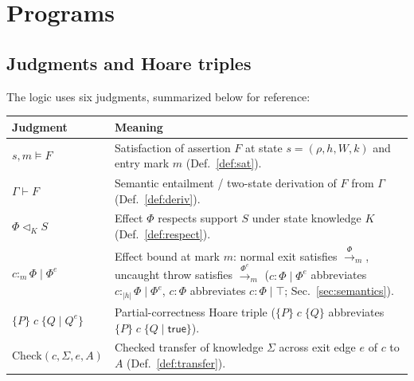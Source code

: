\documentclass[10pt,a4paper]{article}
\theoremstyle{definition}
\theoremstyle{remark}
\newcommand{\kw}[1]{\mathsf{#1}}
\newcommand{\len}[1]{|#1|}
\newcommand{\tr}[1]{\xrightarrow{#1}}
\newcommand{\resp}{\mathrel{\triangleleft}}
\newcommand{\hoare}[3]{\{#1\}\;#2\;\{#3\}}
\newcommand{\hoarex}[4]{\{#1\}\;#2\;\{#3\mid #4\}}
\begin{document}
\section{Programs}\label{sec:programs}

\subsection{Judgments and Hoare triples}

The logic uses six judgments, summarized below for reference:

\begin{center}\small
\begin{tabularx}{\textwidth}{@{}lX@{}}
\toprule
Judgment & Meaning\\
\midrule
$s,m\models F$ & Satisfaction of assertion $F$ at state $s=(\rho,h,W,k)$ and entry mark $m$ (Def.~\ref{def:sat}).\\
$\Gamma\vdash F$ & Semantic entailment / two-state derivation of $F$ from $\Gamma$ (Def.~\ref{def:deriv}).\\
$\Phi\resp_K S$ & Effect $\Phi$ respects support $S$ under state knowledge $K$ (Def.~\ref{def:respect}).\\
$c:_{m}\Phi\mid\Phi^{e}$ & Effect bound at mark $m$: normal exit satisfies $\tr{\Phi}_m$, uncaught throw satisfies $\tr{\Phi^{e}}_m$ ($c:\Phi\mid\Phi^{e}$ abbreviates $c:_{\len h}\Phi\mid\Phi^{e}$, $c:\Phi$ abbreviates $c:\Phi\mid\top$; Sec.~\ref{sec:semantics}).\\
$\hoarex{P}{c}{Q}{Q^{e}}$ & Partial-correctness Hoare triple ($\hoare{P}{c}{Q}$ abbreviates $\hoarex{P}{c}{Q}{\kw{true}}$).\\
$\mathrm{Check}(c,\Sigma,e,A)$ & Checked transfer of knowledge $\Sigma$ across exit edge $e$ of $c$ to $A$ (Def.~\ref{def:transfer}).\\
\bottomrule
\end{tabularx}
\end{center}
\end{document}
